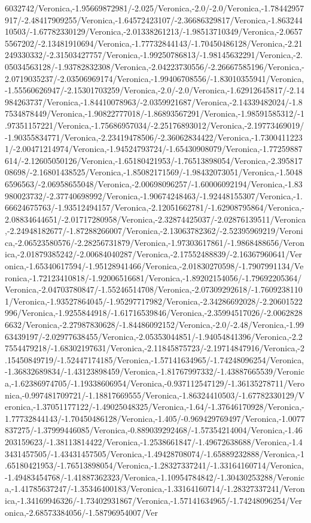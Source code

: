 {\begin{tikzternal}
6032742/Veronica,-1.95669872981/-2.025/Veronica,-2.0/-2.0/Veronica,-1.78442957917/-2.48417909255/Veronica,-1.64572423107/-2.36686329817/Veronica,-1.86324410503/-1.67782330129/Veronica,-2.01338261213/-1.98513710349/Veronica,-2.06575567202/-2.13481910694/Veronica,-1.77732844143/-1.70450486128/Veronica,-2.21249330332/-2.31503427757/Veronica,-1.99250786813/-1.98145632291/Veronica,-2.05034563128/-1.93782832308/Veronica,-2.04223730556/-2.26667585196/Veronica,-2.0719035237/-2.03506969174/Veronica,-1.99406708556/-1.83010355941/Veronica,-1.55560626947/-2.15301703259/Veronica,-2.0/-2.0/Veronica,-1.62912645817/-2.14984263737/Veronica,-1.84410078963/-2.0359921687/Veronica,-2.14339482024/-1.87534878449/Veronica,-1.90822777018/-1.86893567291/Veronica,-1.98591585312/-1.97351157221/Veronica,-1.75686957034/-2.25176893012/Veronica,-2.19773469019/-1.90355834771/Veronica,-2.23419478506/-2.36062834422/Veronica,-1.73004112231/-2.00471214974/Veronica,-1.94524793724/-1.65430908079/Veronica,-1.77259887614/-2.12605050126/Veronica,-1.65180421953/-1.76513898054/Veronica,-2.39581708698/-2.16801438525/Veronica,-1.85082171569/-1.98432073051/Veronica,-1.50486596563/-2.06958655048/Veronica,-2.00698096257/-1.60006092194/Veronica,-1.83980023732/-2.37740698992/Veronica,-1.90674248463/-1.92448155307/Veronica,-1.66624675763/-1.93512494157/Veronica,-2.12051662781/-1.62908795864/Veronica,-2.08834644651/-2.01717280958/Veronica,-2.32874425037/-2.02876139511/Veronica,-2.24948182677/-1.87288266007/Veronica,-2.13063782362/-2.52395969219/Veronica,-2.06523580576/-2.28256731879/Veronica,-1.97303617861/-1.9868488656/Veronica,-2.01879385242/-2.00684040287/Veronica,-2.17552488839/-2.16367960641/Veronica,-1.65340617594/-1.95128941466/Veronica,-2.01830270598/-1.7907991134/Veronica,-1.72123410818/-1.92006516681/Veronica,-1.89202154056/-1.79692205364/Veronica,-2.04703780847/-1.55246514708/Veronica,-2.07309292618/-1.76092381101/Veronica,-1.93527864045/-1.95297717982/Veronica,-2.34286692028/-2.20601522996/Veronica,-1.9255844918/-1.61716539846/Veronica,-2.35994517026/-2.00628286632/Veronica,-2.27987830628/-1.84486092152/Veronica,-2.0/-2.48/Veronica,-1.9963439197/-2.02977638455/Veronica,-2.05353044851/-1.94054841396/Veronica,-2.27554479218/-1.68302197631/Veronica,-2.11845875723/-2.19714847916/Veronica,-2.15450849719/-1.52447174185/Veronica,-1.57141634965/-1.74248096254/Veronica,-1.36832689834/-1.43123898459/Veronica,-1.81767997332/-1.43887665539/Veronica,-1.62386974705/-1.19338606954/Veronica,-0.937112547129/-1.36135278711/Veronica,-0.997481709721/-1.18817669555/Veronica,-1.86324410503/-1.67782330129/Veronica,-1.37051177122/-1.49025048325/Veronica,-1.64/-1.37646170928/Veronica,-1.77732844143/-1.70450486128/Veronica,-1.405/-0.969429769497/Veronica,-1.0077837275/-1.37999446085/Veronica,-0.889039292468/-1.57354214004/Veronica,-1.46203159623/-1.38113814422/Veronica,-1.2538661847/-1.49672638688/Veronica,-1.43431457505/-1.43431457505/Veronica,-1.49428708074/-1.65889232888/Veronica,-1.65180421953/-1.76513898054/Veronica,-1.28327337241/-1.33164160714/Veronica,-1.49483454768/-1.41887362323/Veronica,-1.10954784842/-1.30430253288/Veronica,-1.41785637247/-1.35346400183/Veronica,-1.33164160714/-1.28327337241/Veronica,-1.34169946326/-1.73402931867/Veronica,-1.57141634965/-1.74248096254/Veronica,-2.68573384056/-1.58796954007/Ver
\end{tikzternal}}
